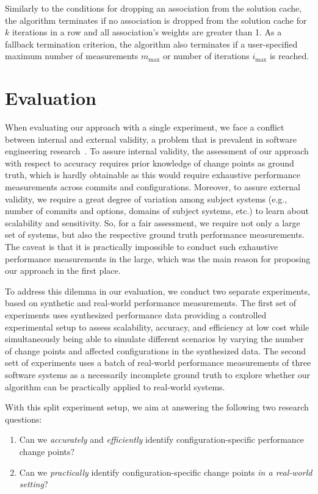 \documentclass[sigconf]{acmart}
\begin{document}
	Similarly to the conditions for dropping an association from the solution cache, the algorithm terminates if no association is dropped from the solution cache for $k$ iterations in a row and all association's weights are greater than 1. As a fallback termination criterion, the algorithm also terminates if a user-specified maximum number of measurements $m_\text{max}$ or number of iterations $i_\text{max}$ is reached. 
	
	\section{Evaluation}
	When evaluating our approach with a single experiment, we face a conflict between internal and external validity, a problem that is prevalent in software engineering research~\cite{siegmund_views_2015}. 
	To assure internal validity, the assessment of our approach with respect to accuracy requires prior knowledge of change points as ground truth, which is hardly obtainable as this would require exhaustive performance measurements across commits and configurations. Moreover, to assure  external validity, we require a great degree of variation among subject systems (e.g., number of commits and options, domains of subject systems, etc.) to learn about scalability and sensitivity. 
	So, for a fair assessment, we require not only a large set of systems, but also the respective ground truth performance measurements. The caveat is that it is practically impossible to conduct such exhaustive performance measurements in the large, which was the main reason for proposing our approach in the first place.
	
	To address this dilemma in our evaluation, we conduct two separate experiments, based on synthetic and real-world performance measurements. The first set of experiments uses synthesized performance data providing a controlled experimental setup to assess scalability, accuracy, and efficiency at low cost while simultaneously being able to simulate different scenarios by varying the number of change points and affected configurations in the synthesized data.
	The second sett of experiments uses a batch of real-world performance measurements of three software systems as a necessarily incomplete ground truth to explore whether our algorithm can be practically applied to real-world systems.
	
	With this split experiment setup, we aim at answering the following two research questions:
	\begin{enumerate}
		\item Can we \emph{accurately} and \emph{efficiently} identify configuration-specific performance change points? 
		\item Can we \emph{practically} identify configuration-specific change points \emph{in a real-world setting}? 
	\end{enumerate}
	
\end{document}
